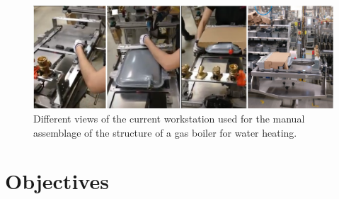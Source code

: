 \begin{figure}[H]
\centerline{\includegraphics[width=6in]{figs/usecase.png}}
\caption{Different views of the current workstation used for the manual assemblage of the structure of a gas boiler for water heating.}
\label{fig:usecase}
\end{figure}

\section{Objectives}

